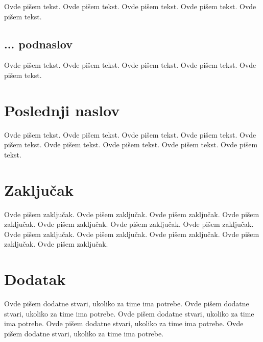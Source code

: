 \documentclass[a4paper]{article}
\begin{document}
Ovde pišem tekst. 
Ovde pišem tekst. 
Ovde pišem tekst. 
Ovde pišem tekst. 
Ovde pišem tekst. 

\subsection{... podnaslov}
\label{subsec:podnaslovM}

Ovde pišem tekst. 
Ovde pišem tekst. 
Ovde pišem tekst. 
Ovde pišem tekst. 
Ovde pišem tekst. 

\section{Poslednji naslov}
\label{sec:naslovM}

Ovde pišem tekst. 
Ovde pišem tekst. 
Ovde pišem tekst. 
Ovde pišem tekst. 
Ovde pišem tekst. 
Ovde pišem tekst. 
Ovde pišem tekst. 
Ovde pišem tekst. 
Ovde pišem tekst. 

\section{Zaključak}
\label{sec:zakljucak}

Ovde pišem zaključak. 
Ovde pišem zaključak. 
Ovde pišem zaključak. 
Ovde pišem zaključak. 
Ovde pišem zaključak. 
Ovde pišem zaključak. 
Ovde pišem zaključak. 
Ovde pišem zaključak. 
Ovde pišem zaključak. 
Ovde pišem zaključak. 
Ovde pišem zaključak. 
Ovde pišem zaključak. 


\appendix
 


\appendix
\section{Dodatak}
Ovde pišem dodatne stvari, ukoliko za time ima potrebe.
Ovde pišem dodatne stvari, ukoliko za time ima potrebe.
Ovde pišem dodatne stvari, ukoliko za time ima potrebe.
Ovde pišem dodatne stvari, ukoliko za time ima potrebe.
Ovde pišem dodatne stvari, ukoliko za time ima potrebe.
\end{document}

